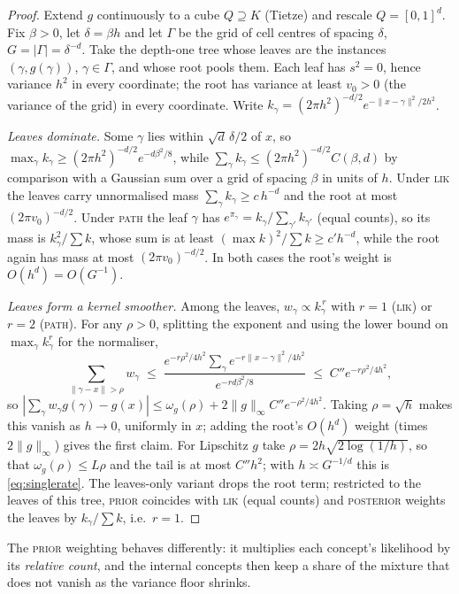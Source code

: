 \documentclass[11pt]{article}
\theoremstyle{definition}
\theoremstyle{remark}
\begin{document}
\begin{proof}
Extend $g$ continuously to a cube $Q\supseteq K$ (Tietze) and rescale $Q=[0,1]^d$.
Fix $\beta>0$, let $\delta=\beta h$ and let $\Gamma$ be the grid of cell centres of
spacing $\delta$, $G=|\Gamma|=\delta^{-d}$.  Take the depth-one tree whose leaves are
the instances $(\gamma,g(\gamma))$, $\gamma\in\Gamma$, and whose root pools them.  Each
leaf has $s^2=0$, hence variance $h^2$ in every coordinate; the root has variance at
least $v_0>0$ (the variance of the grid) in every coordinate.  Write
$k_\gamma=(2\pi h^2)^{-d/2}e^{-\|x-\gamma\|^2/2h^2}$.

\emph{Leaves dominate.}  Some $\gamma$ lies within $\sqrt d\,\delta/2$ of $x$, so
$\max_\gamma k_\gamma\ge(2\pi h^2)^{-d/2}e^{-d\beta^2/8}$, while
$\sum_\gamma k_\gamma\le(2\pi h^2)^{-d/2}C(\beta,d)$ by comparison with a Gaussian sum
over a grid of spacing $\beta$ in units of $h$.  Under \textsc{lik} the leaves carry
unnormalised mass $\sum_\gamma k_\gamma\ge c\,h^{-d}$ and the root at most
$(2\pi v_0)^{-d/2}$.  Under \textsc{path} the leaf $\gamma$ has
$e^{\pi_\gamma}=k_\gamma/\sum_{\gamma'}k_{\gamma'}$ (equal counts), so its mass is
$k_\gamma^2/\sum k$, whose sum is at least $(\max k)^2/\sum k\ge c'h^{-d}$, while the root
again has mass at most $(2\pi v_0)^{-d/2}$.  In both cases the root's weight is
$O(h^d)=O(G^{-1})$.

\emph{Leaves form a kernel smoother.}  Among the leaves, $w_\gamma\propto k_\gamma^{\,r}$
with $r=1$ (\textsc{lik}) or $r=2$ (\textsc{path}).  For any $\rho>0$, splitting the
exponent and using the lower bound on $\max_\gamma k_\gamma^r$ for the normaliser,
\[
\sum_{\|\gamma-x\|>\rho}w_\gamma\;\le\;
\frac{e^{-r\rho^2/4h^2}\sum_\gamma e^{-r\|x-\gamma\|^2/4h^2}}{e^{-rd\beta^2/8}}
\;\le\;C''e^{-r\rho^2/4h^2},
\]
so $|\sum_\gamma w_\gamma g(\gamma)-g(x)|\le\omega_g(\rho)+2\|g\|_\infty C''e^{-\rho^2/4h^2}$.
Taking $\rho=\sqrt h$ makes this vanish as $h\to0$, uniformly in $x$; adding the root's
$O(h^d)$ weight (times $2\|g\|_\infty$) gives the first claim.  For Lipschitz $g$ take
$\rho=2h\sqrt{2\log(1/h)}$, so that $\omega_g(\rho)\le L\rho$ and the tail is at most
$C''h^2$; with $h\asymp G^{-1/d}$ this is \eqref{eq:singlerate}.  The leaves-only
variant drops the root term; restricted to the leaves of this tree, \textsc{prior}
coincides with \textsc{lik} (equal counts) and \textsc{posterior} weights the leaves by
$k_\gamma/\sum k$, i.e.\ $r=1$.
\end{proof}

The \textsc{prior} weighting behaves differently: it multiplies each concept's
likelihood by its \emph{relative count}, and the internal concepts then keep a share of
the mixture that does not vanish as the variance floor shrinks.
\end{document}
